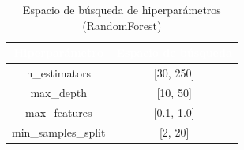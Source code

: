 \begin{table}[htp]
	\centering
	\renewcommand{\arraystretch}{1.3}
		\begin{tabular}{ | c | c | }
			\hline
			\rowcolor[HTML]{5B9BD5} 
			\textcolor{white}{\textbf{Hiperparámetro}} & \textcolor{white}{\textbf{Espacio de búsqueda}}\\
			\hline
			
			n\_estimators & [30, 250] \\
			\hline
			max\_depth & [10, 50] \\
			\hline
			max\_features & [0.1, 1.0] \\
			\hline
			min\_samples\_split & [2, 20] \\
			\hline
			
		\end{tabular} 
		
		\caption{Espacio de búsqueda de hiperparámetros (RandomForest)}
		\label{table:rf_hiperparam}
	\end{table}